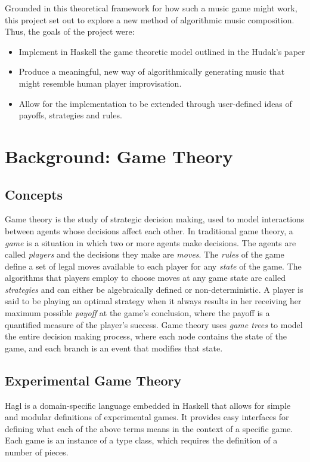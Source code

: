 \documentclass{article}
\begin{document}
Grounded in this theoretical framework for how such a music game might
work, this project set out to explore a new method of algorithmic music
composition. Thus, the goals of the project were:

\begin{itemize}
\itemsep1pt\parskip0pt
\item
  Implement in Haskell the game theoretic model outlined in the Hudak's
  paper
\item
  Produce a meaningful, new way of algorithmically generating music that
  might resemble human player improvisation.
\item
  Allow for the implementation to be extended through user-defined ideas
  of payoffs, strategies and rules.
\end{itemize}

\section{Background: Game Theory}

\subsection{Concepts}
Game theory is the study of strategic decision making, used to model
interactions between agents whose decisions affect each other. In
traditional game theory, a \emph{game} is a situation in which two or
more agents make decisions. The agents are called \emph{players} and the
decisions they make are \emph{moves}. The \emph{rules} of the game
define a set of legal moves available to each player for any
\emph{state} of the game. The algorithms that players employ to choose
moves at any game state are called \emph{strategies} and can either be
algebraically defined or non-deterministic. A player is said to be
playing an optimal strategy when it always results in her receiving her
maximum possible \emph{payoff} at the game's conclusion, where the
payoff is a quantified measure of the player's success. Game theory uses
\emph{game trees} to model the entire decision making process, where
each node contains the state of the game, and each branch is an event
that modifies that state.

\subsection{Experimental Game Theory}
Hagl is a domain-specific language embedded in Haskell that allows for
simple and modular definitions of experimental games. It provides easy interfaces for
defining what each of the above terms means in the context of a specific
game. Each game is an instance of a type class, which requires the
definition of a number of pieces.
\end{document}
